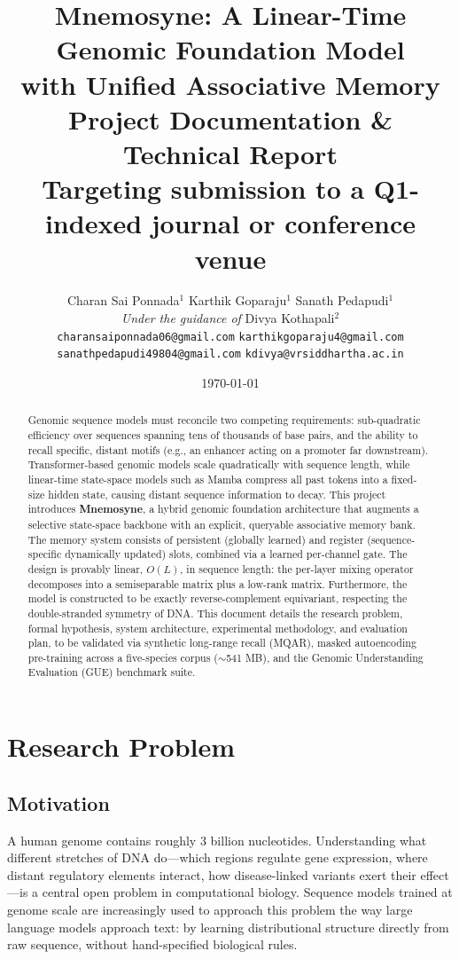 \documentclass[11pt,a4paper]{article}
\title{\textbf{Mnemosyne: A Linear-Time Genomic Foundation Model\\
with Unified Associative Memory}\\
\large Project Documentation \& Technical Report \\
\normalsize Targeting submission to a Q1-indexed journal or conference venue}
\author{
Charan Sai Ponnada$^{1}$ \quad
Karthik Goparaju$^{1}$ \quad
Sanath Pedapudi$^{1}$ \\[0.4em]
\small \textit{Under the guidance of} Divya Kothapali$^{2}$ \\[0.6em]
\small \texttt{charansaiponnada06@gmail.com} \quad
\texttt{karthikgoparaju4@gmail.com} \\
\small \texttt{sanathpedapudi49804@gmail.com} \quad
\texttt{kdivya@vrsiddhartha.ac.in}
}
\date{\today}
\begin{document}
\maketitle

\begin{abstract}
Genomic sequence models must reconcile two competing requirements: sub-quadratic efficiency over sequences spanning tens of thousands of base pairs, and the ability to recall specific, distant motifs (e.g., an enhancer acting on a promoter far downstream). Transformer-based genomic models scale quadratically with sequence length, while linear-time state-space models such as Mamba compress all past tokens into a fixed-size hidden state, causing distant sequence information to decay. This project introduces \textbf{Mnemosyne}, a hybrid genomic foundation architecture that augments a selective state-space backbone with an explicit, queryable associative memory bank. The memory system consists of persistent (globally learned) and register (sequence-specific dynamically updated) slots, combined via a learned per-channel gate. The design is provably linear, $O(L)$, in sequence length: the per-layer mixing operator decomposes into a semiseparable matrix plus a low-rank matrix. Furthermore, the model is constructed to be exactly reverse-complement equivariant, respecting the double-stranded symmetry of DNA. This document details the research problem, formal hypothesis, system architecture, experimental methodology, and evaluation plan, to be validated via synthetic long-range recall (MQAR), masked autoencoding pre-training across a five-species corpus ($\sim$541 MB), and the Genomic Understanding Evaluation (GUE) benchmark suite.
\end{abstract}

\tableofcontents
\newpage

\section{Research Problem}
\subsection{Motivation}
A human genome contains roughly 3 billion nucleotides. Understanding what different stretches of DNA do—which regions regulate gene expression, where distant regulatory elements interact, how disease-linked variants exert their effect—is a central open problem in computational biology. Sequence models trained at genome scale are increasingly used to approach this problem the way large language models approach text: by learning distributional structure directly from raw sequence, without hand-specified biological rules.
\end{document}
